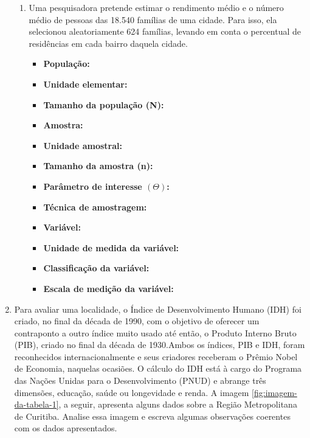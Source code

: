 \begin{enumerate}[label=\emph{\arabic*})]
\begin{enumerate}[label=\emph{\alph*})]
		      \item Uma pesquisadora pretende estimar o rendimento médio e o número médio de pessoas
		            das 18.540 famílias de uma cidade. Para isso, ela selecionou aleatoriamente 624
		            famílias, levando em conta o percentual de residências em cada bairro daquela cidade.

		            \begin{itemize}
			            \item \textbf{População:}~

			            \item \textbf{Unidade elementar:}~

			            \item \textbf{Tamanho da população (N):}~

			            \item \textbf{Amostra:}~

			            \item \textbf{Unidade amostral:}~

			            \item \textbf{Tamanho da amostra (n):}~

			            \item \textbf{Parâmetro de interesse $\left(\varTheta\right)$:}~

			            \item \textbf{Técnica de amostragem:}~

			            \item \textbf{Variável:}~

			            \item \textbf{Unidade de medida da variável:}~

			            \item \textbf{Classificação da variável:}~

			            \item \textbf{Escala de medição da variável:}~
		            \end{itemize}

	      \end{enumerate}

	\item Para avaliar uma localidade, o Índice de Desenvolvimento Humano (IDH) foi criado, no final da década de 1990, com o objetivo de oferecer um contraponto a outro índice muito usado até então, o Produto Interno Bruto (PIB), criado no final da década de 1930.Ambos os índices, PIB e IDH, foram reconhecidos internacionalmente e seus criadores receberam o Prêmio Nobel de Economia, naquelas ocasiões. O cálculo do IDH está à cargo do Programa das Nações Unidas para o Desenvolvimento (PNUD) e abrange três dimensões, educação, saúde ou longevidade e renda. A imagem \ref{fig:imagem-da-tabela-1}, a seguir, apresenta alguns dados sobre a Região Metropolitana de Curitiba. Analise essa imagem e escreva algumas observações coerentes com os dados apresentados.
	

\end{enumerate}
